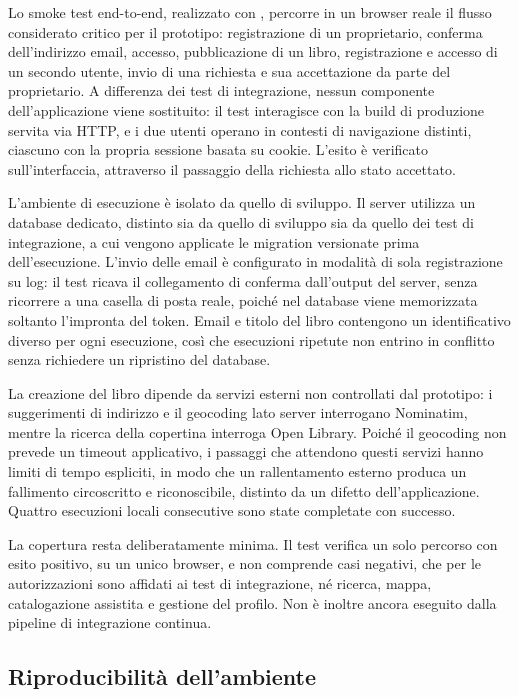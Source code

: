 Lo smoke test end-to-end, realizzato con \playwright{}, percorre in un browser reale il flusso considerato critico per il prototipo: registrazione di un proprietario, conferma dell'indirizzo email, accesso, pubblicazione di un libro, registrazione e accesso di un secondo utente, invio di una richiesta e sua accettazione da parte del proprietario. A differenza dei test di integrazione, nessun componente dell'applicazione viene sostituito: il test interagisce con la build di produzione servita via HTTP, e i due utenti operano in contesti di navigazione distinti, ciascuno con la propria sessione \authjs{} basata su cookie. L'esito è verificato sull'interfaccia, attraverso il passaggio della richiesta allo stato accettato.

L'ambiente di esecuzione è isolato da quello di sviluppo. Il server utilizza un database \postgresql{} dedicato, distinto sia da quello di sviluppo sia da quello dei test di integrazione, a cui vengono applicate le migration versionate prima dell'esecuzione. L'invio delle email è configurato in modalità di sola registrazione su log: il test ricava il collegamento di conferma dall'output del server, senza ricorrere a una casella di posta reale, poiché nel database viene memorizzata soltanto l'impronta del token. Email e titolo del libro contengono un identificativo diverso per ogni esecuzione, così che esecuzioni ripetute non entrino in conflitto senza richiedere un ripristino del database.

La creazione del libro dipende da servizi esterni non controllati dal prototipo: i suggerimenti di indirizzo e il geocoding lato server interrogano Nominatim, mentre la ricerca della copertina interroga Open Library. Poiché il geocoding non prevede un timeout applicativo, i passaggi che attendono questi servizi hanno limiti di tempo espliciti, in modo che un rallentamento esterno produca un fallimento circoscritto e riconoscibile, distinto da un difetto dell'applicazione. Quattro esecuzioni locali consecutive sono state completate con successo.

La copertura resta deliberatamente minima. Il test verifica un solo percorso con esito positivo, su un unico browser, e non comprende casi negativi, che per le autorizzazioni sono affidati ai test di integrazione, né ricerca, mappa, catalogazione assistita e gestione del profilo. Non è inoltre ancora eseguito dalla pipeline di integrazione continua.

\subsection{Riproducibilità dell'ambiente}
\label{subsec:environment-validation}

